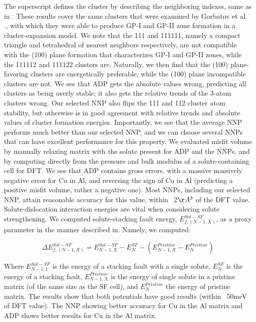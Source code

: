 \documentclass{article}
\begin{document}
The superscript defines the cluster by describing the neighboring indexes, same as in \cite{Gorbatov2019EffectiveAlloys}.
These results cover the same clusters that were examined by Gorbatov et al. .\cite{Gorbatov2019EffectiveAlloys}, with which they were able to produce GP-I and GP-II zone formation in a cluster-expansion model.
We note that the 111 and 111111, namely a compact triangle and tetrahedral of nearest neighbors respectively, are not compatible with the (100) plane formation that characterizes GP-I and GP-II zones, while the 111112 and 111122 clusters are.
Naturally, we then find that the (100) plane-favoring clusters are energetically preferable, while the (100) plane incompatible clusters are not.
We see that ADP gets the absolute values wrong, predicting all clusters as being overly stable; it also gets the relative trends of the 3-atom clusters wrong.
Our selected NNP also flips the 111 and 112 cluster atom stability, but otherwise is in good agreement with relative trends and absolute values of cluster formation energies.
Importantly, we see that the average NNP performs much better than our selected NNP, and we can choose several NNPs that can have excellent performance for this property. 
We evaluated misfit volume by manually relaxing matrix with the solute present for ADP and the NNPs, and by computing directly from the pressure and bulk modulus of a solute-containing cell for DFT.
We see that ADP contains gross errors, with a massive massively negative error for Cu in Al, and reversing the sign of Cu in Al (predicting a positive misfit volume, rather a negative one).
Most NNPs, including our selected NNP, attain reasonable accuracy for this value, within ~2$\AA^3$ of the DFT value. 
Solute-dislocation interaction energies are vital when considering solute strengthening\cite{Leyson2010}.
We computed solute-stacking fault energy, $E^{Sol-SF}_{f,(N-1,X)}$, as a proxy parameter in the manner described in\cite{Yin2017a}.
Namely, we computed:

\begin{equation}
\Delta E^{Sol-SF}_{f,(N-1,X)} = E^{Sol-SF}_{N-1,X} - E^{SF}_{N} - (E^{Pristine}_{N-1,X}-E^{Pristine}_{N})
\end{equation}

Where $E^{Sol-SF}_{N-1,1}$ is the energy of a stacking fault with a single solute,
$E^{SF}_{N}$ is the energy of a stacking fault,
$E^{Pristine}_{N-1,X}$ is the energy of single solute in a pristine matrix (of the same size as the SF cell), 
and $E^{Pristine}_{N}$ the energy of pristine matrix. 
The results show that both potentials have good results (within ~50meV of DFT value).
The NNP showing better accuracy for Cu in the Al matrix and ADP shows better results for Cu in the Al matrix.
\end{document}
